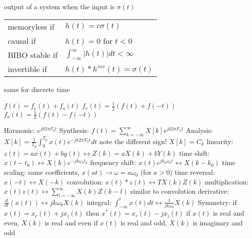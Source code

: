 \documentclass[12pt]{article}
\begin{document}
\begin{multicols*}{2}
\begin{flushleft}
\begin{outline}[longenum]
  \1 output of a system when the input is $\sigma(t)$
  \1 \begin{tabular}{l l}
    memoryless if  & $h(t) = c\sigma(t)$                          \\
    causal if      & $h(t)=0$ for $t<0$                           \\
    BIBO stable if & $\int_{-\infty}^{\infty} |h(t)| dt < \infty$ \\
    invertible if  & $h(t)*h^{inv}(t)=\sigma(t)$                  \\
  \end{tabular}
    \2 same for discrete time


  \1 $f(t) = f_e(t) + f_o(t)$
  \1 $f_e(t) = \frac{1}{2} ( f(t) + f(-t) )$
  \1 $f_o(t) = \frac{1}{2} ( f(t) - f(-t) )$

  \1 Harmonic: $e^{jk2\pi F_0 t}$
  \1 Synthesis: $f(t) = \sum_{k=-\infty}^{\infty} X[k] e^{jk2\pi F_0 t}$
  \1 Analysis: $X[k] = \frac{1}{T_p}\int_{0}^{T_p} x(t) e^{-jk2\pi F_0 t} dt$
    \2 note the different sign!
  \1 $X[k] = C_k$
  \1 linearity: $z(t) = ax(t)+by(t) \leftrightarrow Z(k) = aX(k)+bY(k) $
  \1 time shift: $x(t-t_0) \leftrightarrow X(k)e^{-jk\omega_0t_0}$
  \1 frequency shift: $x(t)e^{jk_0\omega_0t} \leftrightarrow X(k-k_0)$
  \1 time scaling: same coefficients, $x(at) \rightarrow \omega = a\omega_0$ (for $a>0$)
  \1 time reversal: $x(-t) \leftrightarrow X(-k)$
  \1 convolution: $x(t)\ast z(t) \leftrightarrow TX(k)Z(k) $
  \1 multiplication: $x(t)z(t) \leftrightarrow \sum_{l=-\infty}^{\infty} X(k)Z(k-l)$
    \2 similar to convolution
  \1 derivative: $\frac{d}{dt}(x(t)) \leftrightarrow jk\omega_0 X(k) $
  \1 integral: $\int_{-\infty}^{t} x(t) dt \leftrightarrow \frac{1}{jk\omega_0} X(k) $
  \1 Symmetry: if $x(t)=x_r(t)+jx_i(t)$ then $x^*(t)=x_r(t)-jx_i(t)$
  \1 if $x(t)$ is real and even, $X(k)$ is real and even
  \1 if $x(t)$ is real and odd, $X(k)$ is imaginary and odd

\end{outline}
\end{flushleft}
\end{multicols*}
\end{document}
